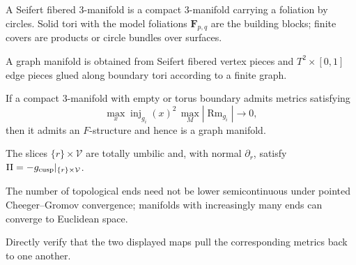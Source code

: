 \begin{definition}
\label{def:chow-iv-seifert-fibered}

A Seifert fibered 3-manifold is a compact 3-manifold carrying a foliation by
circles.  Solid tori with the model foliations \(\mathbf F_{p,q}\) are the
building blocks; finite covers are products or circle bundles over surfaces.
\end{definition}

\begin{definition}
\label{def:chow-iv-graph-manifold}

A graph manifold is obtained from Seifert fibered vertex pieces and
\(T^2\times[0,1]\) edge pieces glued along boundary tori according to a finite
graph.
\end{definition}

\begin{theorem}
\label{thm:chow-iv-cheeger-gromov-graph-manifold}

If a compact 3-manifold with empty or torus boundary admits metrics satisfying
\[
\max_x\operatorname{inj}_{g_i}(x)^2\,\max_M|\operatorname{Rm}_{g_i}|\longrightarrow0,
\]
then it admits an \(F\)-structure and hence is a graph manifold.
\end{theorem}

\begin{claim}
\label{ex:chow-iv-cusp-slices-umbilic}
The slices \(\{r\}\times\mathcal V\) are totally umbilic and, with normal
\(\partial_r\), satisfy \(\mathrm{II}=-g_{\rm cusp}|_{\{r\}\times\mathcal V}\).
\end{claim}

\begin{claim}
\label{ex:chow-iv-ends-cheeger-gromov}
The number of topological ends need not be lower semicontinuous under pointed
Cheeger--Gromov convergence; manifolds with increasingly many ends can converge
to Euclidean space.
\end{claim}

\begin{claim}
\label{ex:chow-iv-hyperbolic-model-isometries}
Directly verify that the two displayed maps pull the corresponding metrics
back to one another.
\end{claim}
